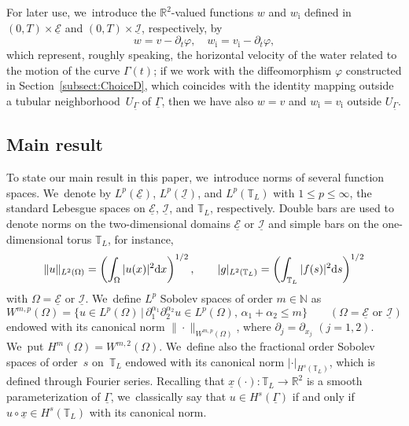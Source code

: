\documentclass[10pt]{amsart}
\newcommand{\R}{{\mathbb R}}
\newcommand{\N}{{\mathbb N}}
\newcommand{\dt}{\partial_t}
\newcommand{\cI}{{\mathcal I}}
\newcommand{\cE}{{\mathcal E}}
\newcommand{\ul}[1]{\underline{#1}}
\newcommand{\itGamma}{\mathit{\Gamma}}
\theoremstyle{definition}
\begin{document}
For later use, we~introduce the $\R^2$-valued functions $w$ and $w_\mathrm{i}$ defined in $(0,T)\times\ul{\cE}$ and $(0,T)\times\ul{\cI}$, respectively, by
\begin{equation}\label{defw}
w=v-\dt\varphi, \quad w_\mathrm{i}=v_\mathrm{i}-\dt\varphi,
\end{equation}
which represent, roughly speaking, the horizontal velocity of the water related to the motion of the curve $\itGamma(t)$;
if we work with the diffeomorphism $\varphi$ constructed in Section~\ref{subsect:ChoiceD},
which coincides with the identity mapping outside a tubular neighborhood~$U_{\ul{\itGamma}}$ of $\ul{\itGamma}$,
then we have also $w=v$ and $w_\mathrm{i}=v_\mathrm{i}$ outside $U_{\ul{\itGamma}}$.

\subsection{Main result}\label{subsect:result}
To state our main result in this paper, we~introduce norms of several function spaces. We~denote by $L^p(\ul{\cE})$, $L^p(\ul{\cI})$, and $L^p(\mathbb{T}_L)$ with $1\leq p\leq \infty$,
the standard Lebesgue spaces on $\ul{\cE}$, $\ul{\cI}$, and $\mathbb{T}_L$, respectively.
Double bars are used to denote norms on the two-dimensional domains $\ul{\cE}$ or $\ul{\cI}$ and simple bars on the one-dimensional torus $\mathbb{T}_L$,
for instance,
\[
\|u\|_{L^2(\Omega)}=\left(\int_\Omega |u(x)|^2 {\rm d}x \right)^{1/2}, \qquad
|g|_{L^2(\mathbb{T}_L)}=\left(\int_{\mathbb{T}_L} |f(s)|^2 {\rm d}s \right)^{1/2}
\]
with $\Omega=\ul{\cE}$ or $\ul{\cI}$. We~define $L^p$ Sobolev spaces of order $m\in \N$ as
\[
W^{m,p}(\Omega)=\{ u\in L^p(\Omega) \,|\, \partial_1^{\alpha_1}\partial_2^{\alpha_2} u \in L^p(\Omega),\, \alpha_1+\alpha_2\leq m\}
\qquad (\Omega=\ul{\cE} \mbox{ or } \ul{\cI})
\]
endowed with its canonical norm $\|\cdot\|_{W^{m,p}(\Omega)}$, where $\partial_j=\partial_{x_j}$ $(j=1,2)$. We~put $H^m(\Omega)=W^{m,2}(\Omega)$. We~define also the fractional order Sobolev spaces of order~$s$ on~$\mathbb{T}_L$ endowed with its canonical norm $|\cdot|_{H^s(\mathbb{T}_L)}$,
which is defined through Fourier series.
Recalling that $\ul{x}(\cdot):{\mathbb T}_L\to {\mathbb R}^2$ is a smooth parameterization of $\ul{\itGamma}$, we~classically say that $u\in H^s(\ul{\itGamma})$ if and only if $u\circ\ul{x}\in H^s({\mathbb T}_L)$ with its canonical norm.
\end{document}
